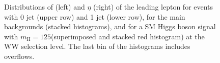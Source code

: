 \begin{figure}
{}
\caption{Distributions of \pt (left) and $\eta$ (right) of the leading lepton for events with 0 jet (upper row) and 1 jet (lower row), for the main backgrounds (stacked histograms), and for a SM Higgs boson signal with $m_\mathrm{H}=125$\GeV (superimposed and stacked red histogram) at the WW selection level. The last bin of the histograms includes overflows.}\label{fig:distr1}
\end{figure}

